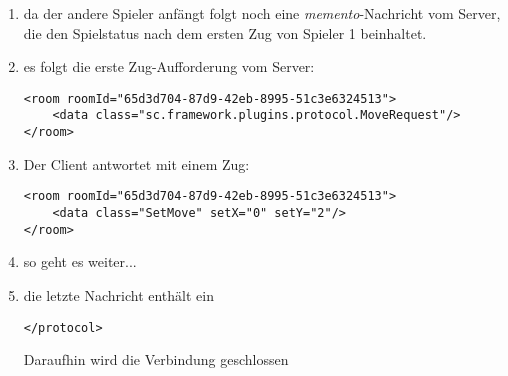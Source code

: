 \documentclass[12pt,a4paper, ngerman, oneside]{scrartcl}
\begin{document}
\begin{enumerate}
\begin{verbatim}
          <field fish="1"/>
          <field fish="2"/>
          <field fish="2"/>
         </field-array>
         <field-array>
          <field fish="1"/>
          <field fish="1"/>
          <field fish="2"/>
          <field fish="1"/>
          <field fish="2"/>
          <field fish="2"/>
          <field fish="1"/>
          <field fish="2"/>
         </field-array>
         <field-array>
          <field fish="1"/>
          <field fish="1"/>
          <field fish="3"/>
          <field fish="1"/>
          <field fish="3"/>
          <field fish="1"/>
          <field fish="2"/>
          <field fish="1"/>
         </field-array>
         <field-array>
          <field fish="1"/>
          <field fish="3"/>
          <field fish="3"/>
          <field fish="1"/>
          <field fish="2"/>
          <field fish="2"/>
          <field fish="1"/>
          <field fish="3"/>
         </field-array>
         <field-array>
          <field fish="1"/>
          <field fish="2"/>
          <field fish="3"/>
          <field fish="1"/>
          <field fish="2"/>
          <field fish="3"/>
          <field fish="1"/>
          <field fish="3"/>
         </field-array>
         <field-array>
          <field fish="1"/>
          <field fish="2"/>
          <field fish="1"/>
          <field fish="1"/>
          <field fish="2"/>
          <field fish="1"/>
          <field fish="2"/>
          <field fish="1"/>
         </field-array>
         <field-array>
          <field fish="0"/>
          <field fish="2"/>
          <field fish="0"/>
          <field fish="1"/>
          <field fish="0"/>
          <field fish="1"/>
          <field fish="0"/>
          <field fish="3"/>
         </field-array>
        </fields>
      </board>
    </state>
  </data>
</room>
\end{verbatim}
\item da der andere Spieler anfängt folgt noch eine \textit{memento}-Nachricht vom Server, die den Spielstatus nach dem ersten Zug von Spieler 1 beinhaltet.
\item es folgt die erste Zug-Aufforderung vom Server: \begin{verbatim}
<room roomId="65d3d704-87d9-42eb-8995-51c3e6324513">
    <data class="sc.framework.plugins.protocol.MoveRequest"/>
</room>
\end{verbatim}
\item Der Client antwortet mit einem Zug: \begin{verbatim}
<room roomId="65d3d704-87d9-42eb-8995-51c3e6324513">
    <data class="SetMove" setX="0" setY="2"/>
</room>
\end{verbatim}
\item so geht es weiter...
\item die letzte Nachricht enthält ein \begin{verbatim}
</protocol>
\end{verbatim}
Daraufhin wird die Verbindung geschlossen
\end{enumerate}
\end{document}
